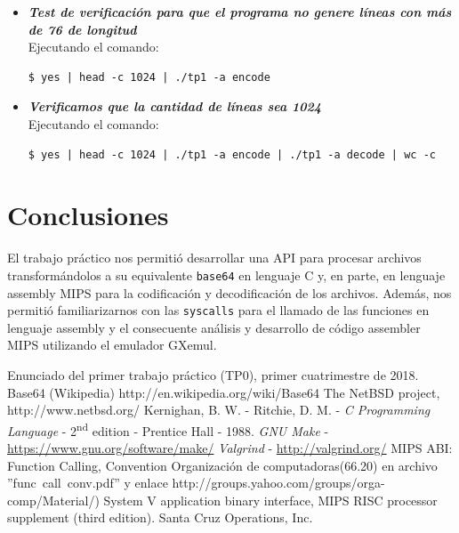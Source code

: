 \documentclass[11pt,a4paper]{article}
\begin{document}
\begin{itemize}
	\item \textit{\textbf{Test de verificación para que el programa no genere líneas con más de 76 de longitud}} \\
	Ejecutando el comando:
	\begin{lstlisting}
$ yes | head -c 1024 | ./tp1 -a encode
	\end{lstlisting}  
 
	
\newpage
	\item \textit{\textbf{Verificamos que la cantidad de líneas sea 1024}}\\
	Ejecutando el comando:
	\begin{lstlisting}
$ yes | head -c 1024 | ./tp1 -a encode | ./tp1 -a decode | wc -c
	\end{lstlisting}  


	\end{itemize}


\newpage

\section{Conclusiones}

El trabajo práctico nos permitió desarrollar una API para procesar archivos transformándolos a su equivalente \texttt{base64} en lenguaje C y, en parte, en lenguaje assembly MIPS para la codificación y decodificación de los archivos. Además, nos permitió familiarizarnos con las \texttt{syscalls} para el llamado de las funciones en lenguaje assembly y el consecuente análisis y desarrollo de código assembler MIPS utilizando el emulador GXemul.


\begin{thebibliography}{10}
	\bibitem{}Enunciado del primer trabajo práctico (TP0), primer cuatrimestre de 2018.
	\bibitem{}Base64 (Wikipedia) http://en.wikipedia.org/wiki/Base64
	\bibitem{}The NetBSD project, http://www.netbsd.org/
	 Kernighan, B. W. - Ritchie, D. M. - \emph{C Programming Language} - 2\textsuperscript{nd} edition - Prentice Hall - 1988.
	 \emph{GNU Make} - \hyperlink{make}{https://www.gnu.org/software/make/}
	 \emph{Valgrind} - \hyperlink{valgrind}{http://valgrind.org/}
	\bibitem{}MIPS ABI: Function Calling, Convention Organización de computadoras(66.20) en archivo ''func\ call\ conv.pdf'' y enlace http://groups.yahoo.com/groups/orga-comp/Material/)
	\bibitem{}System V application binary interface, MIPS RISC processor supplement
(third edition). Santa Cruz Operations, Inc.
\end{thebibliography}
\newpage
\appendix
\end{document}

